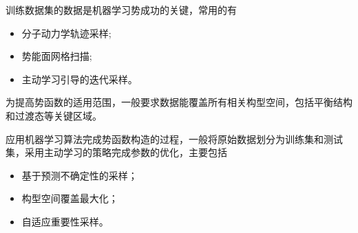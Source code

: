 






训练数据集的数据是机器学习势成功的关键，常用的有
\begin{itemize}
	\item 分子动力学轨迹采样;
	\item 势能面网格扫描;
	\item 主动学习引导的迭代采样。
\end{itemize}
为提高势函数的适用范围，一般要求数据能覆盖所有相关构型空间，包括平衡结构和过渡态等关键区域。

应用机器学习算法完成势函数构造的过程，一般将原始数据划分为训练集和测试集，采用主动学习的策略完成参数的优化，主要包括
\begin{itemize}
	\item 基于预测不确定性的采样；
	\item 构型空间覆盖最大化；
	\item 自适应重要性采样。
\end{itemize}

